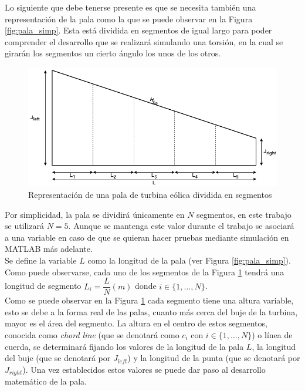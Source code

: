 Lo siguiente que debe tenerse presente es que se necesita también una representación de la pala como la que se puede observar en la Figura \ref{fig:pala_simp}. Esta está dividida en segmentos de igual largo para poder comprender el desarrollo que se realizará simulando una torsión, en la cual se girarán los segmentos un cierto ángulo los unos de los otros.

\begin{figure}[H]
    \centering
    \includegraphics[width=1\textwidth]{images/pala simple segmentada.png}
    \caption{Representación de una pala de turbina eólica dividida en segmentos}
    \label{fig:pala_dividida}
\end{figure}

Por simplicidad, la pala se dividirá únicamente en $N$ segmentos, en este trabajo se utilizará $N=5$. Aunque se mantenga este valor durante el trabajo se asociará a una variable en caso de que se quieran hacer pruebas mediante simulación en MATLAB más adelante. \\
    

Se define la variable $L$ como la longitud de la pala (ver Figura \ref{fig:pala_simp}). Como puede observarse, cada uno de los segmentos de la Figura \ref{fig:pala_dividida} tendrá una longitud de segmento $L_i = \dfrac{L}{N} (m)$ donde $i \in \{1,...,N\}$.\\

Como se puede observar en la Figura \ref{fig:pala_dividida} cada segmento tiene una altura variable, esto se debe a la forma real de las palas, cuanto más cerca del buje de la turbina, mayor es el área del segmento. La altura en el centro de estos segmentos, conocida como \textit{chord line} (que se denotará como $c_i$ con $i \in \{1, ...,N\}$) o línea de cuerda, se determinará fijando los valores de la longitud de la pala $L$, la longitud del buje (que se denotará por $J_{left}$) y la longitud de la punta (que se denotará por $J_{right}$). Una vez establecidos estos valores se puede dar paso al desarrollo matemático de la pala.\\

